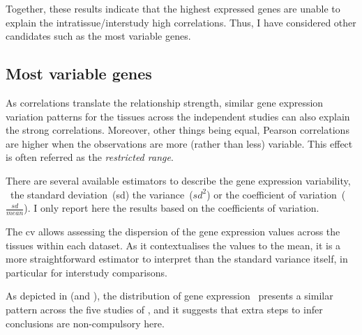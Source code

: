 Together, these results indicate
that the highest expressed genes are unable to explain
the intratissue/interstudy high correlations.
Thus, I have considered other candidates
such as the most variable genes.


\subsection{Most variable genes}
As correlations translate the relationship strength,
similar gene expression variation patterns for the tissues
across the independent studies can also explain the strong correlations.
Moreover, other things being equal,
Pearson correlations are higher
when the observations are more (rather than less) variable.
This effect is often referred as
the \emph{restricted range}.~

There are several available estimators to describe the gene expression variability,
\eg\ the standard deviation~(sd) the variance~($sd^2$) or the coefficient of
variation~($\frac{sd}{mean}$).
I only report here the results based on the coefficients of variation.

The \gls{cv} allows assessing
the dispersion of the gene expression values
across the tissues within each dataset.
As it contextualises the values to the mean,
it is a more straightforward estimator to interpret than
the standard variance itself,
in particular for interstudy comparisons.

\begin{comment}
Visualising the \gls{cv} distribution of
gene expression for the working set \setOne\ (see \Cref{fig:HistCV4T})
allows determining whether they are similar across the five transcriptomic studies
or that inferring conclusions requires more cautions.
\end{comment}
As depicted in  (and ),
the distribution of gene expression \cvs\ presents a similar pattern
across the five studies of \setOne,
and it suggests that extra steps to infer conclusions are non-compulsory here.

